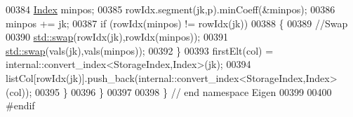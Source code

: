 \begin{DoxyCode}
00384     \hyperlink{namespace_eigen_a62e77e0933482dafde8fe197d9a2cfde}{Index} minpos; 
00385     rowIdx.segment(jk,p).minCoeff(&minpos);
00386     minpos += jk;
00387     \textcolor{keywordflow}{if} (rowIdx(minpos) != rowIdx(jk))
00388     \{
00389       \textcolor{comment}{//Swap}
00390       \hyperlink{endian_8c_a3ca5ecd34b04d6a243c054ac3a57f68d}{std::swap}(rowIdx(jk),rowIdx(minpos));
00391       \hyperlink{endian_8c_a3ca5ecd34b04d6a243c054ac3a57f68d}{std::swap}(vals(jk),vals(minpos));
00392     \}
00393     firstElt(col) = internal::convert\_index<StorageIndex,Index>(jk);
00394     listCol[rowIdx(jk)].push\_back(internal::convert\_index<StorageIndex,Index>(col));
00395   \}
00396 \}
00397 
00398 \} \textcolor{comment}{// end namespace Eigen }
00399 
00400 \textcolor{preprocessor}{#endif}
\end{DoxyCode}
